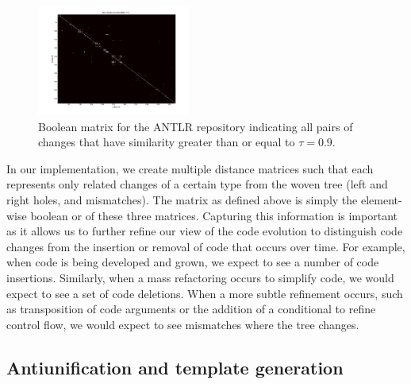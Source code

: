 \begin{figure}
\begin{center}
\includegraphics[width=0.45\textwidth]{figures/distmatrix-0-9.png}
\caption{Boolean matrix for the ANTLR repository indicating all pairs of
changes that have similarity greater than or equal to $\tau = 0.9$.}
\label{fig:boolmat}
\end{center}
\end{figure}

In our implementation, we create multiple distance matrices such that each
represents only related changes of a certain type from the woven tree (left
and right holes, and mismatches).  The matrix as defined above is simply the
element-wise boolean or of these three matrices.  Capturing this information is
important as it allows us to further refine our view of the code evolution to
distinguish code changes from the insertion or removal of code that occurs
over time. For example, when code is being developed and grown, we expect to
see a number of code insertions. Similarly, when a mass refactoring occurs to
simplify code, we would expect to see a set of code deletions.  When a more
subtle refinement occurs, such as transposition of code arguments or the
addition of a conditional to refine control flow, we would expect to see
mismatches where the tree changes.


\subsection{Antiunification and template generation}


